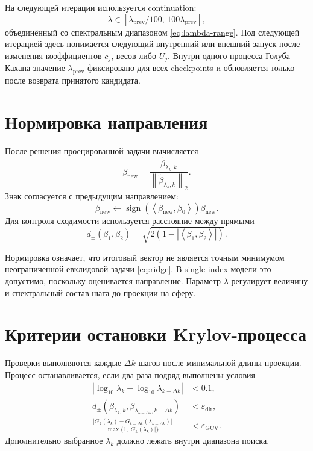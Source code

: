 \documentclass[11pt,a4paper]{article}
\newcommand{\norm}[1]{\left\lVert #1\right\rVert_2}
\newcommand{\ip}[2]{\left\langle #1,#2\right\rangle}
\newcommand{\sign}{\operatorname{sign}}
\begin{document}
На следующей итерации используется continuation:
\[
    \lambda
    \in
    \left[
        \lambda_{\mathrm{prev}}/100,\,
        100\lambda_{\mathrm{prev}}
    \right],
\]
объединённый со спектральным диапазоном \eqref{eq:lambda-range}.
Под следующей итерацией здесь понимается следующий внутренний или внешний
запуск после изменения коэффициентов \(c_j\), весов либо \(U_j\).
Внутри одного процесса Голуба--Кахана значение
\(\lambda_{\mathrm{prev}}\) фиксировано для всех checkpoints и обновляется
только после возврата принятого кандидата.

\section{Нормировка направления}

После решения проецированной задачи вычисляется
\begin{equation}
\label{eq:normalize}
    \beta_{\mathrm{new}}
    =
    \frac{
        \widetilde\beta_{\lambda_k,k}
    }{
        \norm{\widetilde\beta_{\lambda_k,k}}
    }.
\end{equation}
Знак согласуется с предыдущим направлением:
\[
    \beta_{\mathrm{new}}
    \leftarrow
    \sign\!\left(
        \ip{\beta_{\mathrm{new}}}{\beta_0}
    \right)\beta_{\mathrm{new}}.
\]
Для контроля сходимости используется расстояние между прямыми
\begin{equation}
\label{eq:projective-distance}
    d_{\pm}(\beta_1,\beta_2)
    =
    \sqrt{
        2\left(
            1-\left|\ip{\beta_1}{\beta_2}\right|
        \right)
    }.
\end{equation}

Нормировка означает, что итоговый вектор не является точным минимумом
неограниченной евклидовой задачи \eqref{eq:ridge}. В single-index модели это
допустимо, поскольку оценивается направление. Параметр \(\lambda\) регулирует
величину и спектральный состав шага до проекции на сферу.

\section{Критерии остановки Krylov-процесса}

Проверки выполняются каждые \(\Delta k\) шагов после минимальной длины проекции.
Процесс останавливается, если два раза подряд выполнены условия
\begin{align}
\label{eq:stop-lambda}
    \left|
        \log_{10}\lambda_k
        -
        \log_{10}\lambda_{k-\Delta k}
    \right|
    &<0.1,
    \\
\label{eq:stop-direction}
    d_{\pm}
    \left(
        \beta_{\lambda_k,k},
        \beta_{\lambda_{k-\Delta k},k-\Delta k}
    \right)
    &<\varepsilon_{\mathrm{dir}},
    \\
\label{eq:stop-gcv}
    \frac{
        |G_k(\lambda_k)-G_{k-\Delta k}(\lambda_{k-\Delta k})|
    }{
        \max\{1,|G_k(\lambda_k)|\}
    }
    &<\varepsilon_{\mathrm{GCV}}.
\end{align}
Дополнительно выбранное \(\lambda_k\) должно лежать внутри диапазона поиска.
\end{document}
